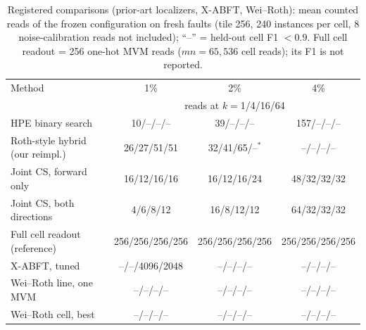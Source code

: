\documentclass[journal]{IEEEtran}
\begin{document}
\begin{table}[t]
\caption{Registered comparisons (prior-art localizers, X-ABFT, Wei--Roth): mean counted reads of the frozen configuration on fresh faults (tile 256, 240 instances per cell, 8 noise-calibration reads not included); ``--'' = held-out cell F1 $<0.9$. Full cell readout = 256 one-hot MVM reads ($mn=65{,}536$ cell reads); its F1 is not reported.}
\label{tab:loc}
\centering\scriptsize\setlength{\tabcolsep}{2.5pt}
\begin{tabular}{lccc}
\toprule
Method & 1\% & 2\% & 4\% \\
\multicolumn{1}{c}{} & \multicolumn{3}{c}{\scriptsize reads at $k{=}$1/4/16/64} \\
\midrule
HPE binary search & 10/--/--/-- & 39/--/--/-- & 157/--/--/-- \\
Roth-style hybrid (our reimpl.) & 26/27/51/51 & 32/41/65/--$^\ast$ & --/--/--/-- \\
Joint CS, forward only & 16/12/16/16 & 16/12/16/24 & 48/32/32/32 \\
Joint CS, both directions & 4/6/8/12 & 16/8/12/12 & 64/32/32/32 \\
Full cell readout (reference) & 256/256/256/256 & 256/256/256/256 & 256/256/256/256 \\
\midrule
X-ABFT, tuned & --/--/4096/2048 & --/--/--/-- & --/--/--/-- \\
Wei--Roth line, one MVM & --/--/--/-- & --/--/--/-- & --/--/--/-- \\
Wei--Roth cell, best & --/--/--/-- & --/--/--/-- & --/--/--/-- \\
\bottomrule
\end{tabular}
\par{}
\end{table}
\end{document}
